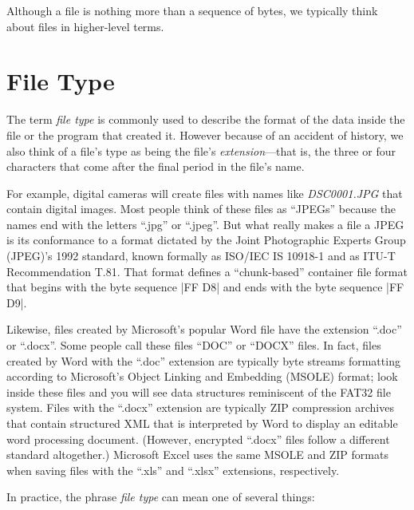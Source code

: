 \documentclass[11pt,letter]{article}
\begin{document}
Although a file is nothing more than a sequence of bytes, we typically
think about files in higher-level terms. 

\section{File Type}

The term \emph{file type} is commonly used to describe the format of
the data inside the file or the program that created it. However
because of an accident of history, we also think of a file's type as
being the file's \emph{extension}---that is, the three or four
characters that come after the final period in the file's name.

For example, digital cameras will create files with names like
\emph{DSC0001.JPG} that contain digital images. Most people think of
these files as ``JPEGs'' because the names end with the letters ``.jpg'' or
``.jpeg''.  But what really makes a file a JPEG is
its conformance to a format dictated by the Joint Photographic Experts
Group (JPEG)'s 1992 standard, known formally as ISO/IEC IS 10918-1 and
as ITU-T Recommendation T.81. That format defines a ``chunk-based''
container file format that begins with the byte sequence |FF D8| and
ends with the byte sequence |FF D9|.

Likewise, files created by Microsoft's popular Word file have the
extension ``.doc'' or ``.docx''. Some people call these files ``DOC''
or ``DOCX'' files. In fact, files created by Word with the ``.doc''
extension are typically byte streams formatting according to Microsoft's Object Linking and
Embedding (MSOLE) format; look inside these files and you will see data
structures reminiscent of the FAT32 file system. Files with the ``.docx'' extension are
typically ZIP compression archives that contain structured XML that is
interpreted by Word to display an editable word processing
document. (However, encrypted ``.docx'' files follow a different
standard altogether.)
Microsoft Excel uses the same MSOLE and ZIP formats when saving files
with the ``.xls'' and ``.xlsx'' extensions, respectively.

In practice, the phrase \emph{file type} can mean one of several things:
\end{document}
